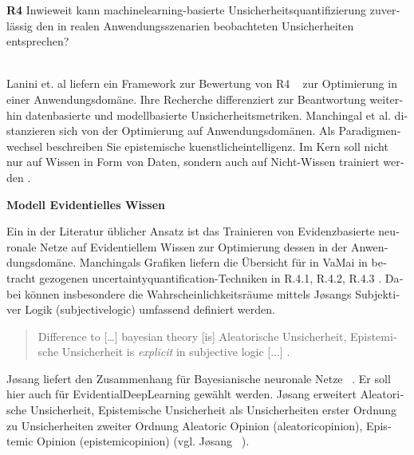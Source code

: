 \begin{otherlanguage}{ngerman}
\textbf{R4} Inwieweit kann \gls{machinelearning}-basierte Unsicherheitsquantifizierung zuverlässig den in realen Anwendungsszenarien beobachteten Unsicherheiten entsprechen?
\par\noindent\\


Lanini et. al liefern ein Framework zur Bewertung von R4 ~\parencite{Lanini2024} zur Optimierung in einer Anwendungsdomäne. Ihre Recherche differenziert zur Beantwortung weiterhin datenbasierte und modellbasierte Unsicherheitsmetriken. 
\newline
Manchingal et al. distanzieren sich von der Optimierung auf Anwendungsdomänen. Als Paradigmenwechsel beschreiben Sie epistemische \gls{kuenstlicheintelligenz}. Im Kern soll nicht nur auf Wissen in Form von Daten, sondern auch auf Nicht-Wissen trainiert werden \parencite{manchingal2025}. 


\pagebreak


\textbf{Modell Evidentielles Wissen}

Ein in der Literatur üblicher Ansatz ist das Trainieren von \gls{Evidenzbasierte neuronale Netze} auf Evidentiellem Wissen zur Optimierung dessen in der Anwendungsdomäne. Manchingals Grafiken liefern die Übersicht für in VaMai in betracht gezogenen \gls{uncertaintyquantification}-Techniken in R.4.1, R.4.2, R.4.3 . Dabei können insbesondere die Wahrscheinlichkeitsräume mittels Jøsangs Subjektiver Logik (\gls{subjectivelogic}) umfassend definiert werden. 

\begin{quote}
  Difference to [\dots] bayesian theory [is] \gls{Aleatorische Unsicherheit}, \gls{Epistemische Unsicherheit} is \textit{explicit} in subjective logic [...] \parencite[vgl S. 42]{josang2016subjective}.
\end{quote}

Jøsang liefert den Zusammenhang für \gls{Bayesianische neuronale Netze} ~\parencite[vgl. S.42]{josang2016subjective}. Er soll hier auch für \gls{EvidentialDeepLearning} gewählt werden. Jøsang erweitert \gls{Aleatorische Unsicherheit}, \gls{Epistemische Unsicherheit} als Unsicherheiten erster Ordnung zu Unsicherheiten zweiter Ordnung \glqq Aleatoric Opinion \grqq (\gls{aleatoricopinion}), \glqq Epistemic Opinion \grqq (\gls{epistemicopinion}) (vgl. Jøsang ~\parencite[S.22, Z.10-16; S.22 Z. 17-26; S.23, Z. 5-; S.23 Z.9-12]{josang2016subjective}). \par\noindent\\


\end{otherlanguage}
